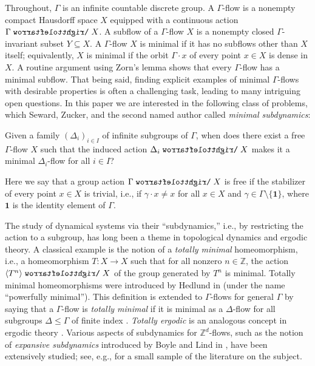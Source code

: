 \documentclass[11pt,reqno,psamsfonts]{amsart}
\theoremstyle{bfnote}
\theoremstyle{definition}
\theoremstyle{remark}
\newcommand{\0}{\varnothing}
\newcommand{\set}[1]{\{#1\}}
\renewcommand{\leq}{\leqslant}
\newcommand{\emphd}[1]{{\fontseries{b}\selectfont\textsf{#1}}}
\newcommand{\acts}{\mathrel{\reflectbox{$\righttoleftarrow$}}}
\newcommand{\G}{\Gamma}
\newcommand{\Z}{\mathbb{Z}}
\newcommand{\iden}{\mathbf{1}}
\numberwithin{equation}{section}
\begin{document}
    Throughout, $\G$ is an infinite
    countable discrete group.
    A \emphd{$\G$-flow} is a nonempty compact Hausdorff space $X$ equipped with a continuous action $\G \acts X$. A \emphd{subflow} of a $\G$-flow $X$ is a nonempty closed $\G$-invariant subset $Y \subseteq X$. A $\G$-flow $X$ is \emphd{minimal} if it has no subflows other than $X$ itself; equivalently, $X$ is minimal if the orbit $\G \cdot x$ of every point $x \in X$ is dense in $X$. A routine argument using Zorn's lemma shows that every $\G$-flow has a minimal subflow. That being said, finding explicit examples of minimal $\G$-flows with desirable properties is often a challenging task, leading to many intriguing open questions. In this paper we are interested in the following class of problems, which Seward, Zucker, and the second named author \cite{FSZ} called \emph{minimal subdynamics}:

    \begin{tcolorbox}[width=\linewidth, sharp corners=all, colback=white!95!black, boxrule=0pt,colframe=white] 
        Given a family $(\Delta_i)_{i \in I}$ of infinite subgroups of $\G$, when does there exist a free $\G$-flow $X$ such that the induced action $\Delta_i \acts X$ makes it a minimal $\Delta_i$-flow for all $i \in I$?
    \end{tcolorbox}

    Here we say that a group action $\G \acts X$ is \emphd{free} if the stabilizer of every point $x \in X$ is trivial, i.e., if $\gamma \cdot x \neq x$ for all $x \in X$ and $\gamma \in \G \setminus \set{\iden}$, where $\iden$ is the identity element of $\G$.

    The study of dynamical systems via their ``subdynamics,'' i.e., by restricting the action to a subgroup, 
    has long been a theme 
    in topological dynamics and ergodic theory. A classical example is the notion of a \emph{totally minimal} homeomorphism, i.e., a homeomorphism $T \colon X \to X$ such that for all nonzero $n \in \Z$, the action $\langle T^n \rangle \acts X$ of the group generated by $T^n$ is minimal. Totally minimal homeomorphisms were introduced by Hedlund in \cite{HedlundSturmian} (under the name ``powerfully minimal'').  
    This definition is extended to $\G$-flows for general $\G$ by saying that a $\G$-flow is \emph{totally minimal} if it is minimal as a $\Delta$-flow for all subgroups $\Delta \leq \G$ of finite index \cite[Defn.~2.27]{GottHed}. \emph{Totally ergodic} is an analogous concept in ergodic theory \cite[Defn.~10.3]{RSErgodic}. Various aspects of subdynamics for $\Z^d$-flows, such as the notion of \emph{expansive subdynamics} introduced 
    by Boyle and Lind in \cite{Expansive1}, have been extensively studied; see, e.g., \cite{Expansive2,Expansive3,Expansive4,Expansive5,Expansive6,Expansive7,Expansive8,Expansive9,Rosenthal}  for a small sample of the literature on the subject.
    
\end{document}
